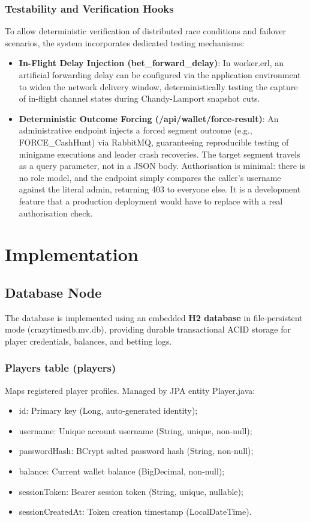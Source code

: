 \documentclass[12pt,a4paper]{article}
\begin{document}
\subsubsection{Testability and Verification Hooks}
To allow deterministic verification of distributed race conditions and failover scenarios, the system incorporates dedicated testing mechanisms:
\begin{itemize}
    \item \textbf{In-Flight Delay Injection (bet\_\allowbreak forward\_\allowbreak delay)}: In worker.erl, an artificial forwarding delay can be configured via the application environment to widen the network delivery window, deterministically testing the capture of in-flight channel states during Chandy-Lamport snapshot cuts.
    \item \textbf{Deterministic Outcome Forcing (/api/wallet/force-result)}: An administrative endpoint injects a forced segment outcome (e.g., FORCE\_\allowbreak CashHunt) via RabbitMQ, guaranteeing reproducible testing of minigame executions and leader crash recoveries. The target segment travels as a query parameter, not in a JSON body. Authorisation is minimal: there is no role model, and the endpoint simply compares the caller's username against the literal admin, returning 403 to everyone else. It is a development feature that a production deployment would have to replace with a real authorisation check.
\end{itemize}

\section{Implementation}

\subsection{Database Node}
The database is implemented using an embedded \textbf{H2 database} in file-persistent mode (crazytimedb.mv.db), providing durable transactional ACID storage for player credentials, balances, and betting logs.

\subsubsection{Players table (players)}
Maps registered player profiles. Managed by JPA entity Player.java:
\begin{itemize}
    \item id: Primary key (Long, auto-generated identity);
    \item username: Unique account username (String, unique, non-null);
    \item passwordHash: BCrypt salted password hash (String, non-null);
    \item balance: Current wallet balance (BigDecimal, non-null);
    \item sessionToken: Bearer session token (String, unique, nullable);
    \item sessionCreatedAt: Token creation timestamp (LocalDateTime).
\end{itemize}
\end{document}
